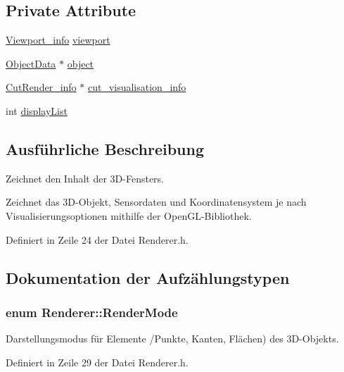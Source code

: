 \subsection*{Private Attribute}
\begin{DoxyCompactItemize}
\item 
\hyperlink{structRenderer_1_1Viewport__info}{Viewport\-\_\-info} \hyperlink{classRenderer_a4428a5ef0ceaf4de5c9991a40990994d}{viewport}
\item 
\hyperlink{classObjectData}{Object\-Data} $\ast$ \hyperlink{classRenderer_a4ad4a42fe6bfd32ff3ef4bb1d59f8f96}{object}
\item 
\hyperlink{structUtils_1_1CutRender__info}{Cut\-Render\-\_\-info} $\ast$ \hyperlink{classRenderer_a119b7d1e3eb740a118e269758dd1a906}{cut\-\_\-visualisation\-\_\-info}
\item 
int \hyperlink{classRenderer_a165ec913fa058d0a38f5e7b7635adfd2}{display\-List}
\end{DoxyCompactItemize}


\subsection{Ausführliche Beschreibung}
Zeichnet den Inhalt der 3\-D-\/\-Fensters. 

Zeichnet das 3\-D-\/\-Objekt, Sensordaten und Koordinatensystem je nach Visualisierungsoptionen mithilfe der Open\-G\-L-\/\-Bibliothek. 

Definiert in Zeile 24 der Datei Renderer.\-h.



\subsection{Dokumentation der Aufzählungstypen}
\hypertarget{classRenderer_aa9844470f59e9fdf3aed088936100863}{
\subsubsection[{Render\-Mode}]{\setlength{\rightskip}{0pt plus 5cm}enum {\bf Renderer\-::\-Render\-Mode}}}\label{classRenderer_aa9844470f59e9fdf3aed088936100863}
Darstellungsmodus für Elemente /\-Punkte, Kanten, Flächen) des 3\-D-\/\-Objekts. 

Definiert in Zeile 29 der Datei Renderer.\-h.



